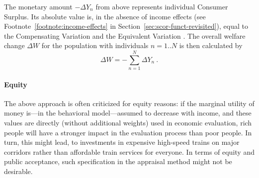 
The monetary amount $ - \Delta Y_n$ from above represents individual Consumer Surplus. Its absolute value is, in the absence of income effects (see Footnote~\ref{footnote:income-effects} in Section~\ref{sec:scor-funct-revisited}), equal to the Compensating Variation and the Equivalent Variation \citep{DalyEtAl2008WelfareMeasuresIncome}.
%
The overall welfare change $\Delta W$ for the population with individuals $n=1..N$ is then calculated by
%
\begin{equation}
\label{eq:ch:economicEval:monetizationWtPAggregate}
\Delta W =  - \sum_{n=1}^N \Delta Y_n \ .
\end{equation}

\paragraph*{Equity}

The above approach is often criticized for equity reasons: if the marginal utility of money is---in the behavioral model---assumed to decrease with income, and these values are directly (without additional weights) used in economic evaluation, rich people will have a stronger impact in the evaluation process than poor people. In turn, this might lead, \eg to investments in expensive high-speed trains on major corridors rather than affordable train services for everyone. In terms of equity and public acceptance, such specification in the appraisal method might not be desirable.

